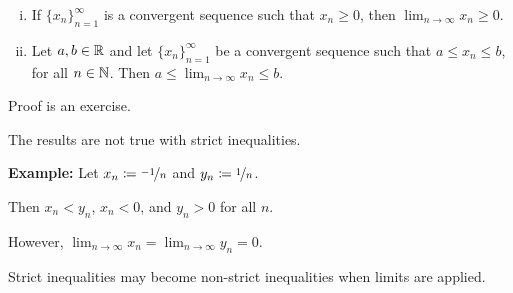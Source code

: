 \documentclass[10pt,aspectratio=149]{beamer}
\begin{document}
\begin{frame}

\begin{corollary}
\begin{enumerate}[(i)]
\item If $\{ x_n \}_{n=1}^\infty$ is a convergent sequence such that $x_n \geq 0$,
then
$\displaystyle
\lim_{n\to\infty} x_n \geq 0$.
\item\pause
Let $a,b \in {\mathbb{R}}$ and
let $\{ x_n \}_{n=1}^\infty$ be a convergent sequence such that
$a \leq x_n \leq b$,
for all $n \in {\mathbb{N}}$.
Then
$\displaystyle a \leq \lim_{n\to\infty} x_n \leq b$.
\end{enumerate}
\end{corollary}

\pause

Proof is an exercise.

\pause
\medskip

The results are not true with strict inequalities.

\pause
\medskip 

\textbf{Example:}
Let $x_n \coloneqq \nicefrac{-1}{n}$ and $y_n \coloneqq \nicefrac{1}{n}$.

\pause
Then $x_n < y_n$, $x_n < 0$, and $y_n > 0$ for all $n$.

\pause
However, $\displaystyle \lim_{n\to\infty} x_n = \lim_{n\to\infty} y_n = 0$.

\pause
\medskip

Strict inequalities may become non-strict
inequalities when limits are applied.
\end{frame}
\end{document}
